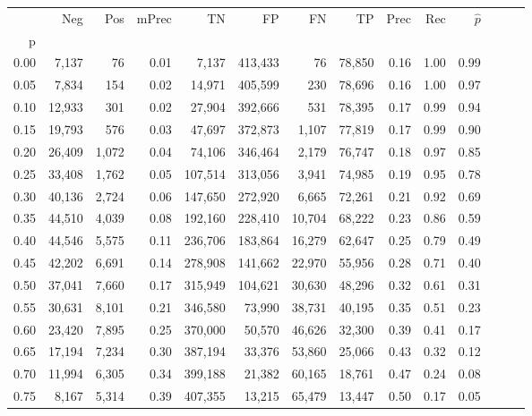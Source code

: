 \begin{tabular}{rrrrrrrrrrrrrr}
\toprule
{} &     Neg &    Pos & mPrec &       TN &       FP &      FN &      TP &  Prec &   Rec & $\hat{p}$ \\
p    &         &        &       &          &          &         &         &       &       &           \\
\midrule
0.00 &   7,137 &     76 &  0.01 &    7,137 &  413,433 &      76 &  78,850 &  0.16 &  1.00 &      0.99 \\
0.05 &   7,834 &    154 &  0.02 &   14,971 &  405,599 &     230 &  78,696 &  0.16 &  1.00 &      0.97 \\
0.10 &  12,933 &    301 &  0.02 &   27,904 &  392,666 &     531 &  78,395 &  0.17 &  0.99 &      0.94 \\
0.15 &  19,793 &    576 &  0.03 &   47,697 &  372,873 &   1,107 &  77,819 &  0.17 &  0.99 &      0.90 \\
0.20 &  26,409 &  1,072 &  0.04 &   74,106 &  346,464 &   2,179 &  76,747 &  0.18 &  0.97 &      0.85 \\
0.25 &  33,408 &  1,762 &  0.05 &  107,514 &  313,056 &   3,941 &  74,985 &  0.19 &  0.95 &      0.78 \\
0.30 &  40,136 &  2,724 &  0.06 &  147,650 &  272,920 &   6,665 &  72,261 &  0.21 &  0.92 &      0.69 \\
0.35 &  44,510 &  4,039 &  0.08 &  192,160 &  228,410 &  10,704 &  68,222 &  0.23 &  0.86 &      0.59 \\
0.40 &  44,546 &  5,575 &  0.11 &  236,706 &  183,864 &  16,279 &  62,647 &  0.25 &  0.79 &      0.49 \\
0.45 &  42,202 &  6,691 &  0.14 &  278,908 &  141,662 &  22,970 &  55,956 &  0.28 &  0.71 &      0.40 \\
0.50 &  37,041 &  7,660 &  0.17 &  315,949 &  104,621 &  30,630 &  48,296 &  0.32 &  0.61 &      0.31 \\
0.55 &  30,631 &  8,101 &  0.21 &  346,580 &   73,990 &  38,731 &  40,195 &  0.35 &  0.51 &      0.23 \\
0.60 &  23,420 &  7,895 &  0.25 &  370,000 &   50,570 &  46,626 &  32,300 &  0.39 &  0.41 &      0.17 \\
0.65 &  17,194 &  7,234 &  0.30 &  387,194 &   33,376 &  53,860 &  25,066 &  0.43 &  0.32 &      0.12 \\
0.70 &  11,994 &  6,305 &  0.34 &  399,188 &   21,382 &  60,165 &  18,761 &  0.47 &  0.24 &      0.08 \\
0.75 &   8,167 &  5,314 &  0.39 &  407,355 &   13,215 &  65,479 &  13,447 &  0.50 &  0.17 &      0.05 \\

\end{tabular}
